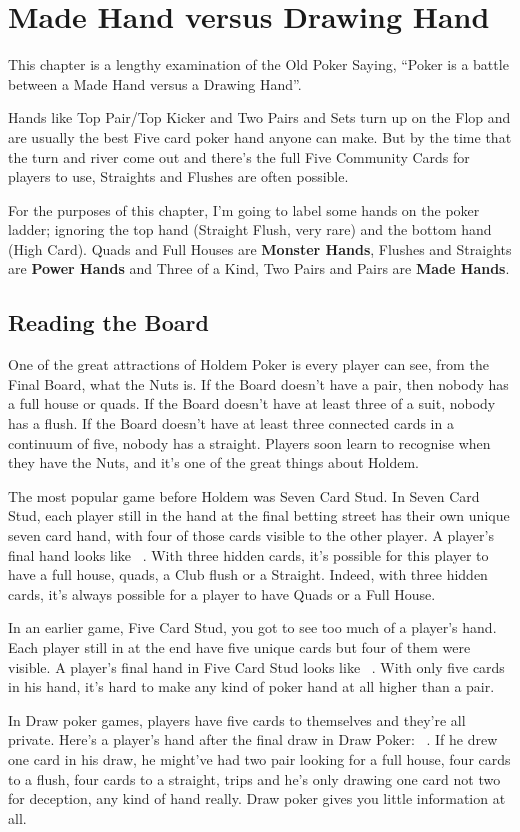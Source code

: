 \chapter{Made Hand versus Drawing Hand}

This chapter is a lengthy examination of the Old Poker Saying, ``Poker
is a battle between a Made Hand versus a Drawing Hand''.

Hands like Top Pair/Top Kicker and Two Pairs and Sets turn up on the
Flop and are usually the best Five card poker hand anyone can
make. But by the time that the turn and river come out and there's the
full Five Community Cards for players to use, Straights and Flushes
are often possible.

For the purposes of this chapter, I'm going to label some hands on the
poker ladder; ignoring the top hand (Straight Flush, very rare) and
the bottom hand (High Card). Quads and Full Houses are \textbf{Monster
Hands}, Flushes and Straights are \textbf{Power Hands} and Three of a
Kind, Two Pairs and Pairs are \textbf{Made Hands}.


\section{Reading the Board}

One of the great attractions of Holdem Poker is every player can see,
from the Final Board, what the Nuts is. If the Board doesn't have a
pair, then nobody has a full house or quads. If the Board doesn't have
at least three of a suit, nobody has a flush. If the Board doesn't
have at least three connected cards in a continuum of five, nobody has
a straight. Players soon learn to recognise when they have the Nuts,
and it's one of the great things about Holdem.

The most popular game before Holdem was Seven Card Stud. In Seven Card
Stud, each player still in the hand at the final betting street has their
own unique seven card hand, with four of those cards visible to the
other player. A player's final hand looks like
\back\back\nines\Qc\Jc\tred\back\ . With three hidden cards, it's possible
for this player to have a full house, quads, a Club flush or a Straight.
Indeed, with three hidden cards, it's always possible for a player to have
Quads or a Full House.

In an earlier game, Five Card Stud, you got to see too much of a
player's hand. Each player still in at the end have five unique cards
but four of them were visible. A player's final hand in Five Card Stud
looks like \back\nines\Qc\Jc\tred\ . With only five cards in his hand,
it's hard to make any kind of poker hand at all higher than a pair.

In Draw poker games, players have five cards to themselves and they're
all private. Here's a player's hand after the final draw in Draw
Poker: \back\back\back\back\back\ . If he drew one card in his draw,
he might've had two pair looking for a full house, four cards to a
flush, four cards to a straight, trips and he's only drawing one card
not two for deception, any kind of hand really. Draw poker gives you
little information at all.
